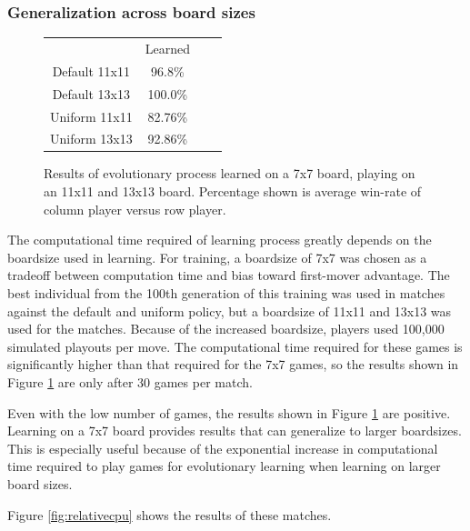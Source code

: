 \documentclass{acm_proc_article-sp}
\begin{document}
\subsubsection*{Generalization across board sizes}



\begin{figure}[t]
	\begin{center}
		\begin{tabular}{c c c c}
		& Learned \\
		Default 11x11 & 96.8\% \\
		Default 13x13 & 100.0\% \\
		Uniform 11x11 & 82.76\% \\
		Uniform 13x13 & 92.86\% \\
		\hline
		\end{tabular}
		\caption{Results of evolutionary process learned on a 7x7 board, playing on an 11x11 and 13x13 board. Percentage shown is average win-rate of column player versus row player.}
		\label{fig:a2results}
	\end{center}
\end{figure}

The computational time required of learning process greatly depends on the boardsize used in learning. For training, a boardsize of 7x7 was chosen as a tradeoff between computation time and bias toward first-mover advantage. The best individual from the 100th generation of this training was used in matches against the default and uniform policy, but a boardsize of 11x11 and 13x13 was used for the matches. Because of the increased boardsize, players used 100,000 simulated playouts per move. The computational time required for these games is significantly higher than that required for the 7x7 games, so the results shown in Figure \ref{fig:a2results} are only after 30 games per match.

Even with the low number of games, the results shown in Figure \ref{fig:a2results} are positive. Learning on a 7x7 board provides results that can generalize to larger boardsizes. This is especially useful because of the exponential increase in computational time required to play games for evolutionary learning when learning on larger board sizes.


Figure \ref{fig:relativecpu} shows the results of these matches.
\end{document}
